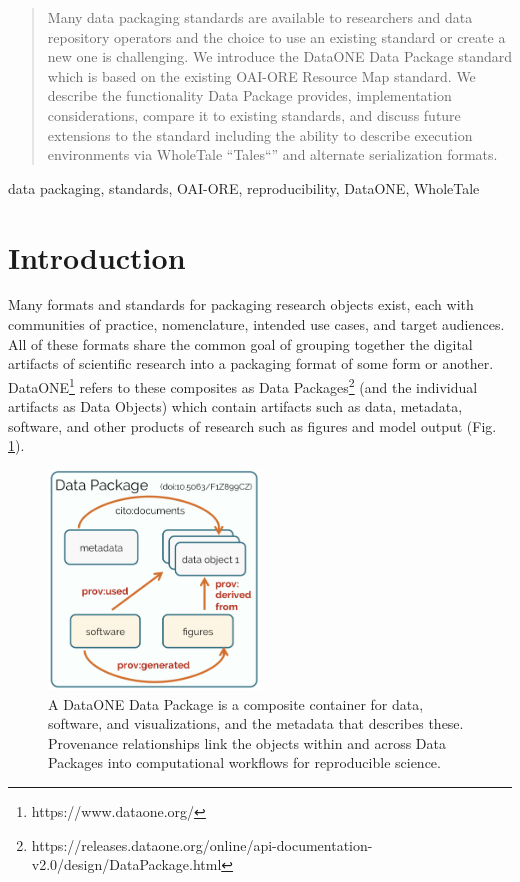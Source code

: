 \documentclass[conference]{IEEEtran}
\begin{document}
\begin{abstract}
  Many data packaging standards are available to researchers and data repository operators and the choice to use an existing standard or create a new one is challenging. We introduce the DataONE Data Package standard which is based on the existing OAI-ORE Resource Map standard. We describe the functionality Data Package provides, implementation considerations, compare it to existing standards, and discuss future extensions to the standard including the ability to describe execution environments via WholeTale ``Tales``'' and alternate serialization formats.
\end{abstract}

\begin{IEEEkeywords}
  data packaging, standards, OAI-ORE, reproducibility, DataONE, WholeTale
\end{IEEEkeywords}

\section{Introduction}

Many formats and standards for packaging research objects exist, each with communities of practice, nomenclature, intended use cases, and target audiences.
All of these formats share the common goal of grouping together the digital artifacts of scientific research into a packaging format of some form or another.
DataONE\footnote{https://www.dataone.org/} refers to these composites as Data Packages\footnote{https://releases.dataone.org/online/api-documentation-v2.0/design/DataPackage.html} (and the individual artifacts as Data Objects) which contain artifacts such as data, metadata, software, and other products of research such as figures and model output (Fig. \ref{dataone-data-package}).

\begin{figure}[ht]
	\centerline{\includegraphics[width=0.5\textwidth]{dataone-data-package.png}}
	\caption{A DataONE Data Package is a composite container for data, software, and visualizations, and the metadata that describes these.  Provenance relationships link the objects within and across Data Packages into computational workflows for reproducible science.}
	\label{dataone-data-package}
\end{figure}
\end{document}
